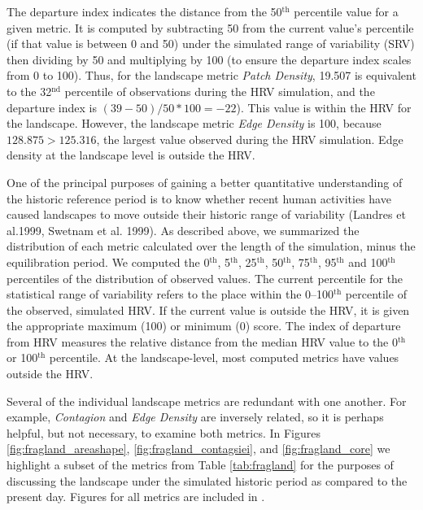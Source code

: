 The departure index indicates the distance from the 50$^{\text{th}}$ percentile value for a given metric. It is computed by subtracting 50 from the current value's percentile (if that value is between 0 and 50) under the simulated range of variability (SRV) then dividing by 50 and multiplying by 100 (to ensure the departure index scales from 0 to 100). Thus, for the landscape metric \emph{Patch Density}, 19.507 is equivalent to the 32$^{\text{nd}}$ percentile of observations during the HRV simulation, and the departure index is $(39-50)/50*100 = -22$). This value is within the HRV for the landscape. However, the landscape metric \emph{Edge Density} is 100, because $128.875 > 125.316$, the largest value observed during the HRV simulation. Edge density at the landscape level is outside the HRV.

One of the principal purposes of gaining a better quantitative understanding of the historic reference period is to know whether recent human activities have caused landscapes to move outside their historic range of variability (Landres et al.1999, Swetnam et al. 1999). As described above, we summarized the distribution of each metric calculated over the length of the simulation, minus the equilibration period. We computed the 0$^{\text{th}}$, 5$^{\text{th}}$, 25$^{\text{th}}$, 50$^{\text{th}}$, 75$^{\text{th}}$, 95$^{\text{th}}$ and 100$^{\text{th}}$ percentiles of the distribution of observed values. The current percentile for the statistical range of variability refers to the place within the 0--100$^{\text{th}}$ percentile of the observed, simulated HRV. If the current value is outside the HRV, it is given the appropriate maximum (100) or minimum (0) score. The index of departure from HRV measures the relative distance from the median HRV value to the 0$^{\text{th}}$ or 100$^{\text{th}}$ percentile. At the landscape-level, most computed metrics have values outside the HRV. 

Several of the individual landscape metrics are redundant with one another. For example, \emph{Contagion} and \emph{Edge Density} are inversely related, so it is perhaps helpful, but not necessary, to examine both metrics. In Figures \ref{fig:fragland_areashape}, \ref{fig:fragland_contagsiei}, and \ref{fig:fragland_core} we highlight a subset of the metrics from Table \ref{tab:fragland} for the purposes of discussing the landscape under the simulated historic period as compared to the present day. Figures for all metrics are included in .

